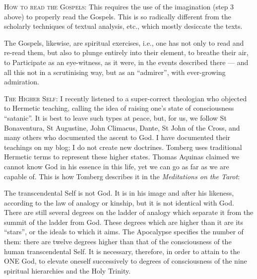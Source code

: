 \textsc{How to read the Gospels:}
This requires the use of the imagination (step 3 above) to properly read the Gospels. This is so radically different
from the scholarly techniques of textual analysis, etc., which mostly desiccate the texts.

\begin{quotationx}
The Gospels, likewise, are spiritual exercises, i.e., one has not only to read and re-read them, but also to plunge
entirely into their element, to breathe their air, to Participate as an eye-witness, as it were, in the events
described there — and all this not in a scrutinising way, but as an “admirer”, with ever-growing
admiration. 

\end{quotationx}
\textsc{The Higher Self:}
I recently listened to a super-correct theologian who objected to Hermetic teaching, calling the idea of raising
one's state of consciousness “satanic”. It is best to leave such types at peace, but, for us, we
follow St Bonaventura, St Augustine, John Climacus, Dante, St John of the Cross, and many others who documented the
ascent to God. I have documented their teachings on my blog; I do not create new doctrines. Tomberg uses traditional
Hermetic terms to represent these higher states. Thomas Aquinas claimed we cannot know God in his essence in this life,
yet we can go as far as we are capable of. This is how Tomberg describes it in the \emph{Meditations on the Tarot}:

\begin{quotationx}
The transcendental Self is not God. It is in his image and after his likeness, according to the law of analogy or
kinship, but it is not identical with God. There are still several degrees on the ladder of analogy which separate it
from the summit of the ladder from God. These degrees which are higher than it are its “stars”, or the ideals to which
it aims. The Apocalypse specifies the number of them: there are twelve degrees higher than that of the consciousness of
the human transcendental Self. It is necessary, therefore, in order to attain to the ONE God, to elevate oneself
successively to degrees of consciousness of the nine spiritual hierarchies and the Holy Trinity. 

\end{quotationx}

